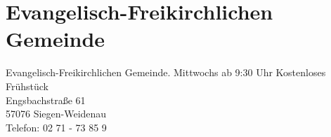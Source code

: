 \section{Evangelisch-Freikirchlichen Gemeinde}
Evangelisch-Freikirchlichen Gemeinde. Mittwochs ab 9:30 Uhr Kostenloses Frühstück \\
Engsbachstraße 61\\
57076 Siegen-Weidenau\\
Telefon: 02 71 - 73 85 9